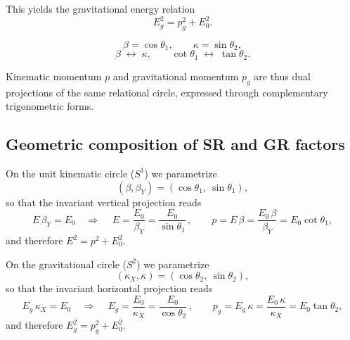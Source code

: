 \documentclass[12pt, a4paper]{article}
\begin{document}
This yields the gravitational energy relation
\begin{equation}
    E_{g}^{2} = p_g^{2} + E_{0}^{2}.
\end{equation}
\begin{tcolorbox}[colback=gray!5, colframe=black!60!black, title=Summary:]
\[
\beta = \cos\theta_{1}, 
\qquad 
\kappa = \sin\theta_{2},
\]
\[
\beta \;\longleftrightarrow\; \kappa,
\qquad
\cot\theta_{1} \;\longleftrightarrow\; \tan\theta_{2}.
\]

Kinematic momentum $p$ and gravitational momentum $p_g$ are thus dual 
projections of the same relational circle, expressed through complementary 
trigonometric forms.
\end{tcolorbox}


\subsection{Geometric composition of SR and GR factors}

On the unit kinematic circle ($S^1$) we parametrize
\[
(\beta,\beta_Y)=(\cos\theta_1,\ \sin\theta_1),
\]
so that the invariant vertical projection reads
\[
E\,\beta_Y=E_0 \quad\Rightarrow\quad 
\boxed{\,E=\dfrac{E_0}{\beta_Y}=\dfrac{E_0}{\sin\theta_1}\,},\qquad
p=E\,\beta=\dfrac{E_0\,\beta}{\beta_Y}=E_0\cot\theta_1,
\]
and therefore \(E^2=p^2+E_0^2\).

On the gravitational circle  ($S^2$) we parametrize
\[
(\kappa_X,\kappa)=(\cos\theta_2,\ \sin\theta_2),
\]
so that the invariant horizontal projection reads
\[
E_g\,\kappa_X=E_0 \quad\Rightarrow\quad 
\boxed{\,E_g=\dfrac{E_0}{\kappa_X}=\dfrac{E_0}{\cos\theta_2}\,},\qquad
p_g=E_g\,\kappa=\dfrac{E_0\,\kappa}{\kappa_X}=E_0\tan\theta_2,
\]
and therefore \(E_g^2=p_g^2+E_0^2\).
\end{document}
